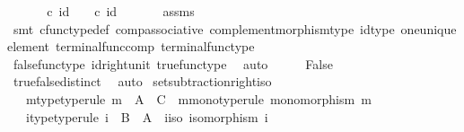 \begin{isabellebody}
\ \ \isamarkupfalse%
\ \isamarkupfalse%
\ {\isachardoublequoteopen}{\isasymt}\ {\isasymcirc}\isactrlsub c\ id\ {\isasymone}\ {\isacharequal}{\kern0pt}\ {\isasymf}\ {\isasymcirc}\isactrlsub c\ id\ {\isasymone}{\isachardoublequoteclose}\isanewline
\ \ \ \ \isamarkupfalse%
\ assms\ \isamarkupfalse%
\ {\isacharparenleft}{\kern0pt}smt\ cfunc{\isacharunderscore}{\kern0pt}type{\isacharunderscore}{\kern0pt}def\ comp{\isacharunderscore}{\kern0pt}associative\ complement{\isacharunderscore}{\kern0pt}morphism{\isacharunderscore}{\kern0pt}type\ id{\isacharunderscore}{\kern0pt}type\ one{\isacharunderscore}{\kern0pt}unique{\isacharunderscore}{\kern0pt}element\ terminal{\isacharunderscore}{\kern0pt}func{\isacharunderscore}{\kern0pt}comp\ terminal{\isacharunderscore}{\kern0pt}func{\isacharunderscore}{\kern0pt}type{\isacharparenright}{\kern0pt}\isanewline
\ \ \isamarkupfalse%
\ \isamarkupfalse%
\ {\isachardoublequoteopen}{\isasymt}\ {\isacharequal}{\kern0pt}\ {\isasymf}{\isachardoublequoteclose}\isanewline
\ \ \ \ \isamarkupfalse%
\ false{\isacharunderscore}{\kern0pt}func{\isacharunderscore}{\kern0pt}type\ id{\isacharunderscore}{\kern0pt}right{\isacharunderscore}{\kern0pt}unit{}\ true{\isacharunderscore}{\kern0pt}func{\isacharunderscore}{\kern0pt}type\ \isamarkupfalse%
\ auto\isanewline
\ \ \isamarkupfalse%
\ \isamarkupfalse%
\ False\isanewline
\ \ \ \ \isamarkupfalse%
\ true{\isacharunderscore}{\kern0pt}false{\isacharunderscore}{\kern0pt}distinct\ \isamarkupfalse%
\ auto\isanewline
{}\isamarkupfalse%
%
\endisatagproof
{\isafoldproof}%
%
\isadelimproof
\isanewline
%
\endisadelimproof
\isanewline
{}\isamarkupfalse%
\ set{\isacharunderscore}{\kern0pt}subtraction{\isacharunderscore}{\kern0pt}right{\isacharunderscore}{\kern0pt}iso{\isacharcolon}{\kern0pt}\isanewline
\ \ \ m{\isacharunderscore}{\kern0pt}type{\isacharbrackleft}{\kern0pt}type{\isacharunderscore}{\kern0pt}rule{\isacharbrackright}{\kern0pt}{\isacharcolon}{\kern0pt}\ {\isachardoublequoteopen}m\ {\isacharcolon}{\kern0pt}\ A\ {\isasymrightarrow}\ C{\isachardoublequoteclose}\ \ m{\isacharunderscore}{\kern0pt}mono{\isacharbrackleft}{\kern0pt}type{\isacharunderscore}{\kern0pt}rule{\isacharbrackright}{\kern0pt}{\isacharcolon}{\kern0pt}\ {\isachardoublequoteopen}monomorphism\ m{\isachardoublequoteclose}\isanewline
\ \ \ i{\isacharunderscore}{\kern0pt}type{\isacharbrackleft}{\kern0pt}type{\isacharunderscore}{\kern0pt}rule{\isacharbrackright}{\kern0pt}{\isacharcolon}{\kern0pt}\ {\isachardoublequoteopen}i\ {\isacharcolon}{\kern0pt}\ B\ {\isasymrightarrow}\ A{\isachardoublequoteclose}\ \ i{\isacharunderscore}{\kern0pt}iso{\isacharcolon}{\kern0pt}\ {\isachardoublequoteopen}isomorphism\ i{\isachardoublequoteclose}\isanewline

\end{isabellebody}
